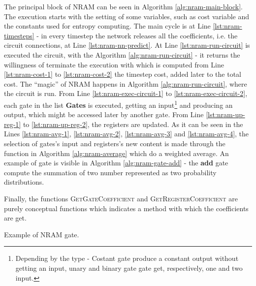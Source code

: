 The principal block of NRAM can be seen in Algorithm \ref{alg:nram-main-block}. The execution starts with the setting of some variables, such as cost variable and the constants used for entropy computing. The main cycle is at Line \ref{lst:nram-timesteps} - in every timestep the network releases all the coefficients, i.e. the circuit connections, at Line \ref{lst:nram-nn-predict}. At Line \ref{lst:nram-run-circuit} is executed the circuit, with the Algorithm \ref{alg:nram-run-circuit} - it returns the willingness of terminate the execution with which is computed from Line \ref{lst:nram-cost-1} to \ref{lst:nram-cost-2} the timestep cost, added later to the total cost.
\newline\newline
The ``magic'' of NRAM happens in Algorithm \ref{alg:nram-run-circuit}, where the circuit is run. From Line \ref{lst:nram-exec-circuit-1} to \ref{lst:nram-exec-circuit-2}, each gate in the list \textbf{Gates} is executed, getting an input\footnote{Depending by the type - Costant gate produce a constant output without getting an input, unary and binary gate gate get, respectively, one and two input.} and producing an output, which might be accessed later by another gate. From Line \ref{lst:nram-up-reg-1} to \ref{lst:nram-up-reg-2}, the registers are updated.
\newline\newline
As it can be seen in the Lines \ref{lst:nram-avg-1}, \ref{lst:nram-avg-2}, \ref{lst:nram-avg-3} and \ref{lst:nram-avg-4}, the selection of gates's input and registers's new content is made through the function in Algorithm \ref{alg:nram-average} which do a weighted average. An example of gate is visible in Algorithm \ref{alg:nram-gate-add} - the \textbf{add} gate compute the summation of two number represented as two probability distributions.

Finally, the functions \textsc{GetGateCoefficient} and \textsc{GetRegisterCoefficient} are purely conceptual functions which indicates a method with which the coefficients are get.

\begin{algorithm}
	\begin{algorithmic}[1]
				\EndFor{}
			\EndFor{}
		\EndFunction
	\end{algorithmic}
	\caption{Example of NRAM gate.}
	\label{alg:nram-gate-add}
\end{algorithm}

